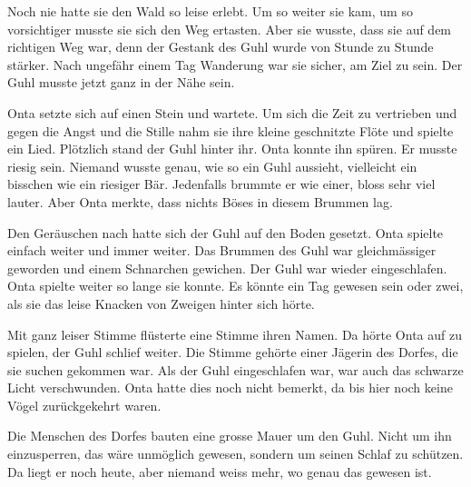 \begin{swb}
Noch nie hatte sie den Wald so leise erlebt. Um so weiter sie kam, um so vorsichtiger musste sie sich den Weg ertasten. Aber sie wusste, dass sie auf dem richtigen Weg war, denn der Gestank des Guhl wurde von Stunde zu Stunde stärker. Nach ungefähr einem Tag Wanderung war sie sicher, am Ziel zu sein. Der Guhl musste jetzt ganz in der Nähe sein.

Onta setzte sich auf einen Stein und wartete. Um sich die Zeit zu vertrieben und gegen die Angst und die Stille nahm sie ihre kleine geschnitzte Flöte und spielte ein Lied. Plötzlich stand der Guhl hinter ihr. Onta konnte ihn spüren. Er musste riesig sein. Niemand wusste genau, wie so ein Guhl aussieht, vielleicht ein bisschen wie ein riesiger Bär. Jedenfalls brummte er wie einer, bloss sehr viel lauter. Aber Onta merkte, dass nichts Böses in diesem Brummen lag. 

Den Geräuschen nach hatte sich der Guhl auf den Boden gesetzt. Onta spielte einfach weiter und immer weiter. Das Brummen des Guhl war gleichmässiger geworden und einem Schnarchen gewichen. Der Guhl war wieder eingeschlafen. Onta spielte weiter so lange sie konnte. Es könnte ein Tag gewesen sein oder zwei, als sie das leise Knacken von Zweigen hinter sich hörte.

Mit ganz leiser Stimme flüsterte eine Stimme ihren Namen. Da hörte Onta auf zu spielen, der Guhl schlief weiter. Die Stimme gehörte einer Jägerin des Dorfes, die sie suchen gekommen war. Als der Guhl eingeschlafen war, war auch das schwarze Licht verschwunden. Onta hatte dies noch nicht bemerkt, da bis hier noch keine Vögel zurückgekehrt waren.

Die Menschen des Dorfes bauten eine grosse Mauer um den Guhl. Nicht um ihn einzusperren, das wäre unmöglich gewesen, sondern um seinen Schlaf zu schützen. Da liegt er noch heute, aber niemand weiss mehr, wo genau das gewesen ist. \end{swb}\hfill {\color{DeepPink}\decofourleft}

